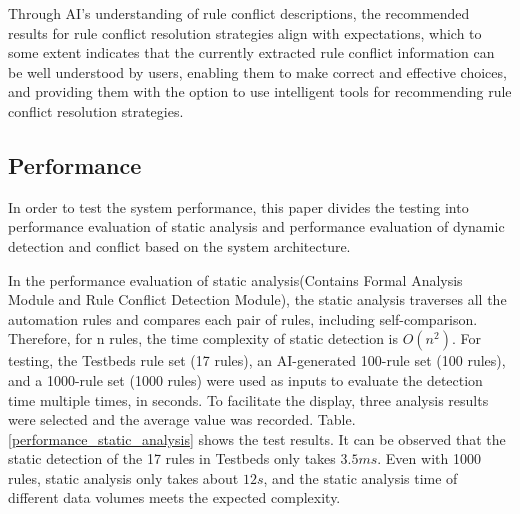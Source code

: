 Through AI's understanding of rule conflict descriptions, the recommended results for rule conflict resolution strategies align with expectations, which to some extent indicates that the currently extracted rule conflict information can be well understood by users, enabling them to make correct and effective choices, and providing them with the option to use intelligent tools for recommending rule conflict resolution strategies.
\subsection{Performance} 
In order to test the system performance, this paper divides the testing into performance evaluation of static analysis and performance evaluation of dynamic detection and conflict based on the system architecture.

In the performance evaluation of static analysis(Contains Formal Analysis Module and Rule Conflict Detection Module), the static analysis traverses all the automation rules and compares each pair of rules, including self-comparison. Therefore, for n rules, the time complexity of static detection is $O\left(n^2\right)$. For testing, the Testbeds rule set (17 rules), an AI-generated 100-rule set (100 rules), and a 1000-rule set (1000 rules) were used as inputs to evaluate the detection time multiple times, in seconds. To facilitate the display, three analysis results were selected and the average value was recorded. Table.\ref{performance_static_analysis} shows the test results. It can be observed that the static detection of the 17 rules in Testbeds only takes $3.5ms$. Even with 1000 rules, static analysis only takes about $12s$, and the static analysis time of different data volumes meets the expected complexity.

